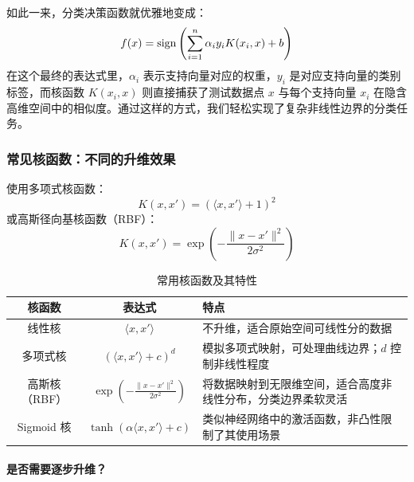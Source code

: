 {如此一来，分类决策函数就优雅地变成：
\[
f(x) = {\rm sign}\left(\sum_{i=1}^n \alpha_i y_i K(x_i, x) + b \right)
\]
在这个最终的表达式里，\(\alpha_i\) 表示支持向量对应的权重，\(y_i\) 是对应支持向量的类别标签，而核函数 \(K(x_i,x)\) 则直接捕获了测试数据点 \(x\) 与每个支持向量 \(x_i\) 在隐含高维空间中的相似度。通过这样的方式，我们轻松实现了复杂非线性边界的分类任务。

%
%

\subsubsection{常见核函数：不同的升维效果}


使用多项式核函数：
\[
K(x, x') = (\langle x, x' \rangle + 1)^2
\]
或高斯径向基核函数（RBF）：
\[
K(x, x') = \exp\left(-\frac{\|x - x'\|^2}{2\sigma^2}\right)
\]


\begin{table}[htbp]
\centering
\caption{常用核函数及其特性}
\begin{tabular}{|c|c|p{7cm}|}
\hline
\textbf{核函数} & \textbf{表达式} & \textbf{特点} \\
\hline
线性核 & $\langle x, x' \rangle$ & 不升维，适合原始空间可线性分的数据 \\
\hline
多项式核 & $(\langle x, x' \rangle + c)^d$ & 模拟多项式映射，可处理曲线边界；$d$ 控制非线性程度 \\
\hline
高斯核（RBF） & $\exp\left(-\frac{\|x - x'\|^2}{2\sigma^2}\right)$ & 将数据映射到无限维空间，适合高度非线性分布，分类边界柔软灵活 \\
\hline
Sigmoid 核 & $\tanh(\alpha \langle x, x' \rangle + c)$ & 类似神经网络中的激活函数，非凸性限制了其使用场景 \\
\hline
\end{tabular}
\label{tab:kernelfunctions}
\end{table}

\paragraph*{是否需要逐步升维？}

}
